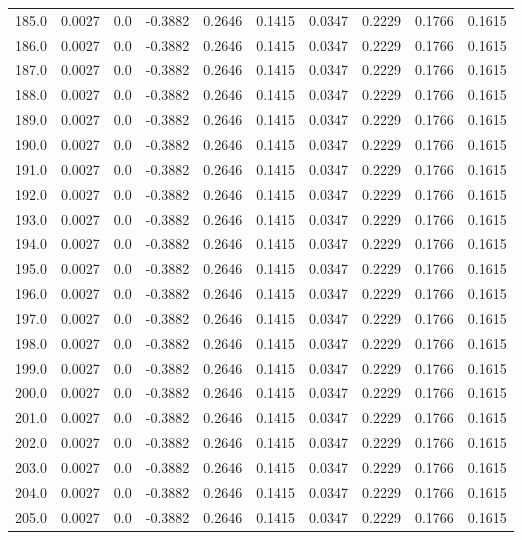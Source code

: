 \begin{longtable}{lrrrrrrrrr}
185.0 & 0.0027 & 0.0 & -0.3882 & 0.2646 & 0.1415 & 0.0347 & 0.2229 & 0.1766 & 0.1615 \\
186.0 & 0.0027 & 0.0 & -0.3882 & 0.2646 & 0.1415 & 0.0347 & 0.2229 & 0.1766 & 0.1615 \\
187.0 & 0.0027 & 0.0 & -0.3882 & 0.2646 & 0.1415 & 0.0347 & 0.2229 & 0.1766 & 0.1615 \\
188.0 & 0.0027 & 0.0 & -0.3882 & 0.2646 & 0.1415 & 0.0347 & 0.2229 & 0.1766 & 0.1615 \\
189.0 & 0.0027 & 0.0 & -0.3882 & 0.2646 & 0.1415 & 0.0347 & 0.2229 & 0.1766 & 0.1615 \\
190.0 & 0.0027 & 0.0 & -0.3882 & 0.2646 & 0.1415 & 0.0347 & 0.2229 & 0.1766 & 0.1615 \\
191.0 & 0.0027 & 0.0 & -0.3882 & 0.2646 & 0.1415 & 0.0347 & 0.2229 & 0.1766 & 0.1615 \\
192.0 & 0.0027 & 0.0 & -0.3882 & 0.2646 & 0.1415 & 0.0347 & 0.2229 & 0.1766 & 0.1615 \\
193.0 & 0.0027 & 0.0 & -0.3882 & 0.2646 & 0.1415 & 0.0347 & 0.2229 & 0.1766 & 0.1615 \\
194.0 & 0.0027 & 0.0 & -0.3882 & 0.2646 & 0.1415 & 0.0347 & 0.2229 & 0.1766 & 0.1615 \\
195.0 & 0.0027 & 0.0 & -0.3882 & 0.2646 & 0.1415 & 0.0347 & 0.2229 & 0.1766 & 0.1615 \\
196.0 & 0.0027 & 0.0 & -0.3882 & 0.2646 & 0.1415 & 0.0347 & 0.2229 & 0.1766 & 0.1615 \\
197.0 & 0.0027 & 0.0 & -0.3882 & 0.2646 & 0.1415 & 0.0347 & 0.2229 & 0.1766 & 0.1615 \\
198.0 & 0.0027 & 0.0 & -0.3882 & 0.2646 & 0.1415 & 0.0347 & 0.2229 & 0.1766 & 0.1615 \\
199.0 & 0.0027 & 0.0 & -0.3882 & 0.2646 & 0.1415 & 0.0347 & 0.2229 & 0.1766 & 0.1615 \\
200.0 & 0.0027 & 0.0 & -0.3882 & 0.2646 & 0.1415 & 0.0347 & 0.2229 & 0.1766 & 0.1615 \\
201.0 & 0.0027 & 0.0 & -0.3882 & 0.2646 & 0.1415 & 0.0347 & 0.2229 & 0.1766 & 0.1615 \\
202.0 & 0.0027 & 0.0 & -0.3882 & 0.2646 & 0.1415 & 0.0347 & 0.2229 & 0.1766 & 0.1615 \\
203.0 & 0.0027 & 0.0 & -0.3882 & 0.2646 & 0.1415 & 0.0347 & 0.2229 & 0.1766 & 0.1615 \\
204.0 & 0.0027 & 0.0 & -0.3882 & 0.2646 & 0.1415 & 0.0347 & 0.2229 & 0.1766 & 0.1615 \\
205.0 & 0.0027 & 0.0 & -0.3882 & 0.2646 & 0.1415 & 0.0347 & 0.2229 & 0.1766 & 0.1615 \\

\end{longtable}
